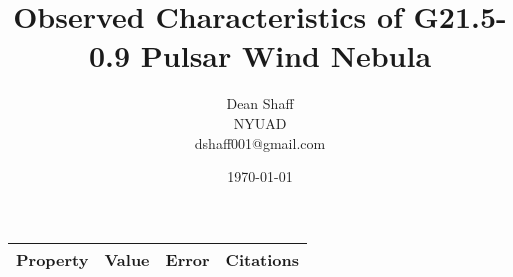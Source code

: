 \documentclass[14pt,onecolumn]{article}
\begin{document}
\title{Observed Characteristics of G21.5-0.9 Pulsar Wind Nebula}
\author{Dean Shaff\\
NYUAD\\
dshaff001@gmail.com}
\date{\today}
\maketitle

\begin{tabular}{| L{5cm} | L{5cm} | L{5cm} | L{5cm} |}
\hline
Property & Value & Error & Citations \\
\hline
\end{tabular}
\end{document}
